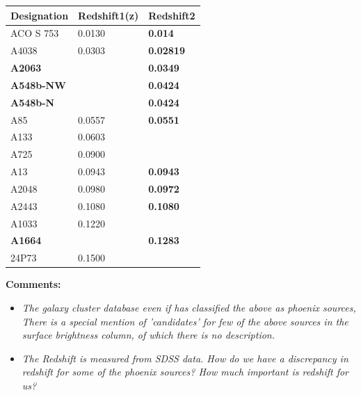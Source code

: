 \documentclass[12pt]{report}
\newcommand{\tbf}[1]{\textbf{#1}}
\newcommand{\tit}[1]{\textit{#1}}
\begin{document}
\begin{center}
\begin{tabular}{|p{4cm}|p{4cm}|p{4cm}|}
\hline 
\tbf{Designation} & Redshift1(z) & Redshift2\\
\hline
ACO S 753 & 0.0130 & \tbf{0.014}\\
A4038 & 0.0303 & \tbf{0.02819}\\
\tbf{A2063}&&\tbf{0.0349}\\
\tbf{A548b-NW} &&\tbf{0.0424}\\
\tbf{A548b-N} &&\tbf{0.0424}\\
A85& 0.0557 & \tbf{0.0551}\\
A133 & 0.0603\\
A725 & 0.0900\\
A13 & 0.0943 & \tbf{0.0943}\\
A2048 &0.0980& \tbf{0.0972}\\
A2443 & 0.1080 & \tbf{0.1080}\\
A1033 & 0.1220\\
\tbf{A1664} & &\tbf{0.1283}\\
24P73 & 0.1500\\
\hline
\end{tabular}
\end{center}
\tbf{Comments:}
\begin{itemize}
\item \tit{The galaxy cluster database even if has classified the above as phoenix sources, There is a special mention of 'candidates' for few of the above sources in the surface brightness column, of which there is no description.}\\
\item \tit{ The Redshift is measured from SDSS data. How do we have a discrepancy in redshift for some of the phoenix sources? How much important is redshift for us?}
\end{itemize}
\end{document}
